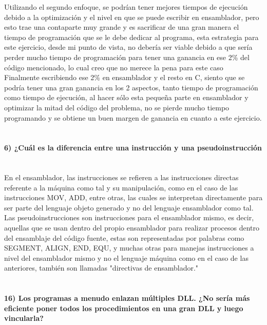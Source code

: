 \documentclass[a4paper,12pt]{article}
\begin{document}
	Utilizando el segundo enfoque, se podrían tener mejores tiempos de ejecución debido a la optimización y el nivel en que se puede escribir en ensamblador, pero esto trae una contaparte muy grande y es sacrificar de una gran manera el tiempo de programación que se le debe dedicar al programa, esta estrategia para este ejercicio, desde mi punto de vista, no debería ser viable debido a que sería perder mucho tiempo de programación para tener una ganancia en ese 2\% del código mencionado, lo cual creo que no merece la pena para este caso\\
	
	Finalmente escribiendo ese 2\% en ensamblador y el resto en C, siento que se podría tener una gran ganancia en los 2 aspectos, tanto tiempo de programación como tiempo de ejecución, al hacer sólo esta pequeña parte en ensamblador y optimizar la mitad del código del problema, no se pierde mucho tiempo programando y se obtiene un buen margen de ganancia en cuanto a este ejercicio.
	 
	\paragraph{\\6) ¿Cuál es la diferencia entre una instrucción y una pseudoinstrucción\\\\}

	En el ensamblador, las instrucciones se refieren a las instrucciones directas referente a la máquina como tal y su manipulación, como en el caso de las instrucciones MOV, ADD, entre otras, las cuales se interpretan directamente para ser parte del lenguaje objeto generado y no del lenguaje ensamblador como tal. Las pseudoinstrucciones son instrucciones para el ensamblador mismo, es decir, aquellas que se usan dentro del propio ensamblador para realizar procesos dentro del ensamblaje del código fuente, estas son representadas por palabras como SEGMENT, ALIGN, END, EQU, y muchas otras para manejas instrucciones a nivel del ensamblador mismo y no el lenguaje máquina como en el caso de las anteriores, también son llamadas "directivas de ensamblador."\\
	  	
	\paragraph{\\16) Los programas a menudo enlazan múltiples DLL. ¿No sería más eficiente poner todos los procedimientos en una gran DLL y luego vincularla?\\\\}
\end{document}
